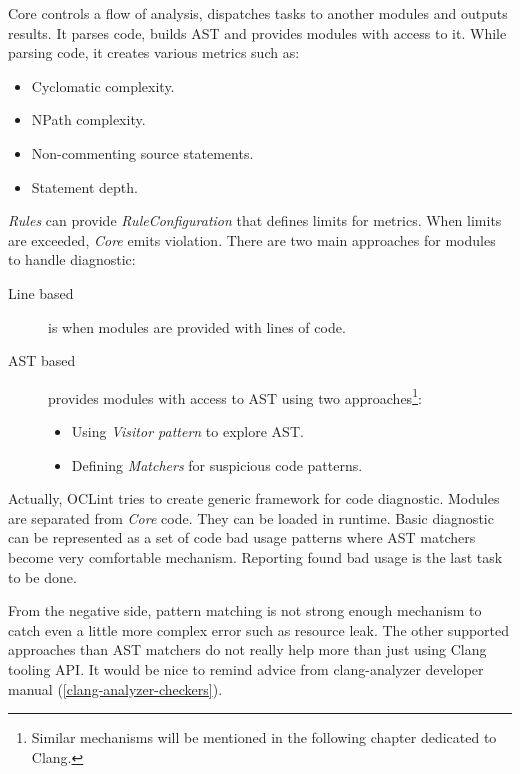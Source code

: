 Core controls a flow of analysis, dispatches tasks to another modules and outputs results. It parses code, builds AST and provides modules with access to it. While parsing code, it creates various metrics such as:

\begin{itemize}
\item Cyclomatic complexity.
\item NPath complexity.
\item Non-commenting source statements.
\item Statement depth.
\end{itemize}

\emph{Rules} can provide \emph{RuleConfiguration} that defines limits for metrics. When limits are exceeded, \emph{Core} emits violation. There are two main approaches for modules to handle diagnostic:

\begin{description}
\item[Line based] is when modules are provided with lines of code.
\item[AST based] provides modules with access to AST using two approaches\footnote{Similar mechanisms will be mentioned in the following chapter dedicated to Clang.}:
	\begin{itemize}
	\item Using \emph{Visitor pattern} to explore AST.
	\item Defining \emph{Matchers} for suspicious code patterns.
	\end{itemize}
\end{description}

Actually, OCLint tries to create generic framework for code diagnostic. Modules are separated from \emph{Core} code. They can be loaded in runtime. Basic diagnostic can be represented as a set of code bad usage patterns where AST matchers become very comfortable mechanism. Reporting found bad usage is the last task to be done.

From the negative side, pattern matching is not strong enough mechanism to catch even a little more complex error such as resource leak. The other supported approaches than AST matchers do not really help more than just using Clang tooling API. It would be nice to remind advice from clang-analyzer developer manual (\ref{clang-analyzer-checkers}).

